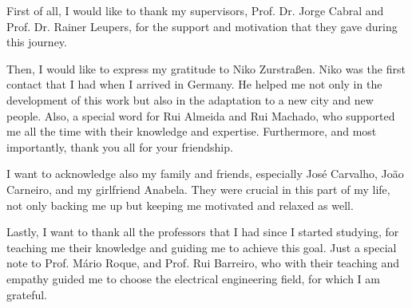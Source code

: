 
First of all, I would like to thank my supervisors, Prof. Dr. Jorge Cabral and Prof. Dr. Rainer Leupers, for the support and motivation that 
they gave during this journey.

Then, I would like to express my gratitude to Niko Zurstraßen. Niko was the first contact that I had when I arrived in Germany. He helped me 
not only in the development of this work but also in the adaptation to a new city and new people. Also, a special word for Rui Almeida and 
Rui Machado, who supported me all the time with their knowledge and expertise. Furthermore, and most importantly, thank you all for your 
friendship.

I want to acknowledge also my family and friends, especially José Carvalho, João Carneiro, and my girlfriend Anabela. 
They were crucial in this part of my life, not only backing me up but keeping me motivated and relaxed as well.

Lastly, I want to thank all the professors that I had since I started studying, for teaching me their knowledge and guiding me to achieve this 
goal. Just a special note to Prof. Mário Roque, and Prof. Rui Barreiro, who with their teaching and empathy guided me to 
choose the electrical engineering field, for which I am grateful.
